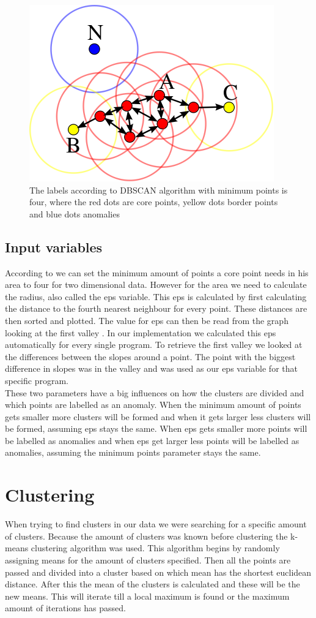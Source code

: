 \begin{figure}[h]
    \centering
    \includegraphics[width=.4\textwidth]{graphs/dbscan.png}
    \caption{The labels according to DBSCAN algorithm with minimum points is four, where the red dots are core points, yellow dots border points and blue dots anomalies}
    \label{fig:dbscan}
\end{figure}

\subsection{Input variables}
According to \cite{ester1996density} we can set the minimum amount of points a core point needs in his area to four for two dimensional data. However for the area we need to calculate the radius, also called the eps variable. This eps is calculated by first calculating the distance to the fourth nearest neighbour for every point. These distances are then sorted and plotted. The value for eps can then be read from the graph looking at the first valley \cite{ester1996density}. In our implementation we calculated this eps automatically for every single program. To retrieve the first valley we looked at the differences between the slopes around a point. The point with the biggest difference in slopes was in the valley and was used as our eps variable for that specific program.\\

These two parameters have a big influences on how the clusters are divided and which points are labelled as an anomaly. When the minimum amount of points gets smaller more clusters will be formed and when it gets larger less clusters will be formed, assuming eps stays the same. When eps gets smaller more points will be labelled as anomalies and when eps get larger less points will be labelled as anomalies, assuming the minimum points parameter stays the same.

\section{Clustering}
When trying to find clusters in our data we were searching for a specific amount of clusters. Because the amount of clusters was known before clustering the k-means clustering algorithm was used. This algorithm begins by randomly assigning means for the amount of clusters specified. Then all the points are passed and divided into a cluster based on which mean has the shortest euclidean distance. After this the mean of the clusters is calculated and these will be the new means. This will iterate till a local maximum is found or the maximum amount of iterations has passed.